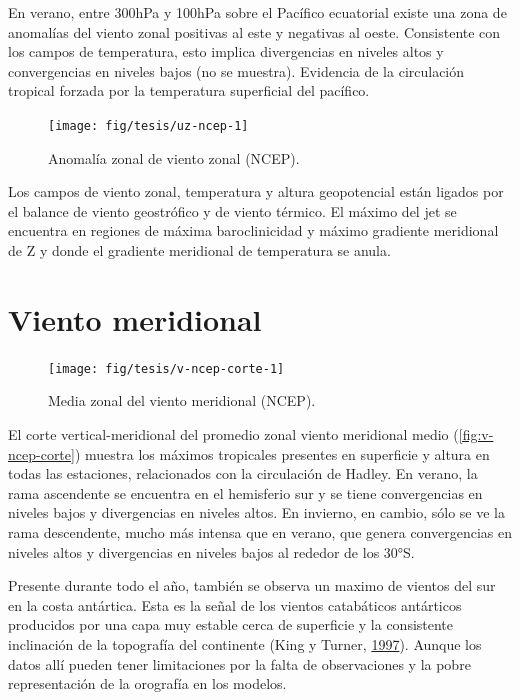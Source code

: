 \documentclass[spanish,a4paper,12pt,oneside]{book}
\begin{document}
En verano, entre 300hPa y 100hPa sobre el Pacífico ecuatorial existe una
zona de anomalías del viento zonal positivas al este y negativas al
oeste. Consistente con los campos de temperatura, esto implica
divergencias en niveles altos y convergencias en niveles bajos (no se
muestra). Evidencia de la circulación tropical forzada por la
temperatura superficial del pacífico.

\begin{landscape}\begin{figure}

{\centering \texttt{[image: fig/tesis/uz-ncep-1]} 

}

\caption{Anomalía zonal de viento zonal (NCEP).}\label{fig:uz-ncep}
\end{figure}
\end{landscape}

Los campos de viento zonal, temperatura y altura geopotencial están
ligados por el balance de viento geostrófico y de viento térmico. El
máximo del jet se encuentra en regiones de máxima baroclinicidad y
máximo gradiente meridional de Z y donde el gradiente meridional de
temperatura se anula.

\section{Viento meridional}\label{viento-meridional}

\begin{figure}
\texttt{[image: fig/tesis/v-ncep-corte-1]} \caption{Media zonal del viento meridional (NCEP).}\label{fig:v-ncep-corte}
\end{figure}

El corte vertical-meridional del promedio zonal viento meridional medio
(\autoref{fig:v-ncep-corte}) muestra los máximos tropicales presentes en
superficie y altura en todas las estaciones, relacionados con la
circulación de Hadley. En verano, la rama ascendente se encuentra en el
hemisferio sur y se tiene convergencias en niveles bajos y divergencias
en niveles altos. En invierno, en cambio, sólo se ve la rama
descendente, mucho más intensa que en verano, que genera convergencias
en niveles altos y divergencias en niveles bajos al rededor de los 30°S.

Presente durante todo el año, también se observa un maximo de vientos
del sur en la costa antártica. Esta es la señal de los vientos
catabáticos antárticos producidos por una capa muy estable cerca de
superficie y la consistente inclinación de la topografía del continente
(King y Turner, \protect\hyperlink{ref-King1997}{1997}). Aunque los
datos allí pueden tener limitaciones por la falta de observaciones y la
pobre representación de la orografía en los modelos.
\end{document}

